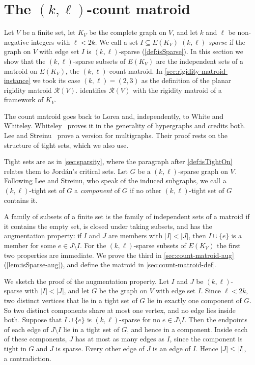 \section{The \texorpdfstring{$(k, \ell)$}{(k, l)}-count matroid}
\label{sec:count-matroid}

Let $V$ be a finite set, let $K_V$ be the complete graph on $V$, and
let $k$ and $\ell$ be non-negative integers with $\ell < 2k$. We call a
set $I \subseteq E(K_V)$ \emph{$(k, \ell)$-sparse} if the graph on $V$
with edge set $I$ is $(k, \ell)$-sparse (\cref{def:isSparse}). In this
section we show that the $(k, \ell)$-sparse subsets of $E(K_V)$ are the
independent sets of a matroid on $E(K_V)$, the $(k, \ell)$-count
matroid. In \cref{sec:rigidity-matroid-instance} we took its case
$(k, \ell) = (2, 3)$ as the definition of the planar rigidity matroid
$\mathcal{R}(V)$. 
identifies $\mathcal{R}(V)$ with the rigidity matroid of a framework of
$K_V$.

The count matroid goes back to Lorea and, independently, to White and
Whiteley. Whiteley~\cite[Proposition~A.1.1]{whiteley1996} proves it in
the generality of hypergraphs and credits both. Lee and
Streinu~\cite[Theorem~2]{leeStreinu2008} prove a version for
multigraphs. Their proof rests on the structure of tight sets, which we
also use.

Tight sets are as in \cref{sec:sparsity}, where the paragraph after
\cref{def:isTightOn} relates them to Jord\'an's critical sets. Let $G$
be a $(k, \ell)$-sparse graph on $V$. Following Lee and Streinu, who
speak of the induced subgraphs, we call a $(k, \ell)$-tight set of $G$
a \emph{component} of $G$ if no other $(k, \ell)$-tight set of $G$
contains it.

A family of subsets of a finite set is the family of independent sets
of a matroid if it contains the empty set, is closed under taking
subsets, and has the augmentation property: if $I$ and $J$ are members
with $|I| < |J|$, then $I \cup \{e\}$ is a member for some
$e \in J \setminus I$. For the $(k, \ell)$-sparse subsets of $E(K_V)$
the first two properties are immediate. We prove the third in
\cref{sec:count-matroid-aug} (\cref{lem:isSparse-aug}), and define the
matroid in \cref{sec:count-matroid-def}.

We sketch the proof of the augmentation property. Let $I$ and $J$ be
$(k, \ell)$-sparse with $|I| < |J|$, and let $G$ be the graph on $V$
with edge set $I$. Since $\ell < 2k$, two distinct vertices that lie in
a tight set of $G$ lie in exactly one component of $G$. So two distinct
components share at most one vertex, and no edge lies inside both.
Suppose that $I \cup \{e\}$ is $(k, \ell)$-sparse for no
$e \in J \setminus I$. Then the endpoints of each edge of
$J \setminus I$ lie in a tight set of $G$, and hence in a component.
Inside each of these components, $J$ has at most as many edges as $I$,
since the component is tight in $G$ and $J$ is sparse. Every other edge
of $J$ is an edge of $I$. Hence $|J| \le |I|$, a contradiction.

